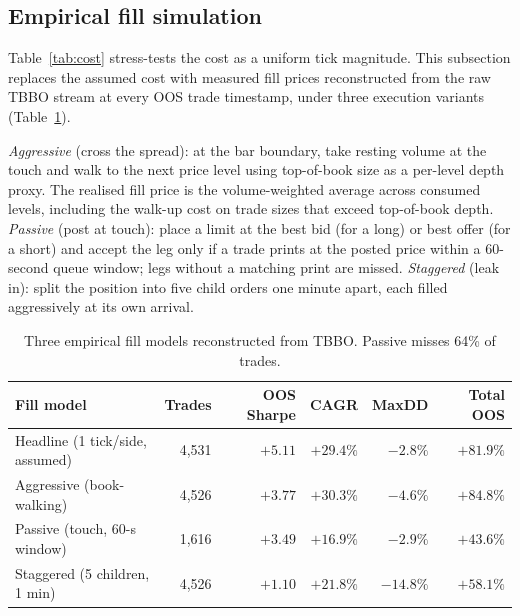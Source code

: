 ﻿\documentclass[11pt,a4paper]{article}
\begin{document}
\subsection{Empirical fill simulation}

Table~\ref{tab:cost} stress-tests the cost as a uniform tick magnitude. This subsection replaces the assumed cost with measured fill prices reconstructed from the raw TBBO stream at every OOS trade timestamp, under three execution variants (Table~\ref{tab:fillsim}).

\emph{Aggressive} (cross the spread): at the bar boundary, take resting volume at the touch and walk to the next price level using top-of-book size as a per-level depth proxy. The realised fill price is the volume-weighted average across consumed levels, including the walk-up cost on trade sizes that exceed top-of-book depth. \emph{Passive} (post at touch): place a limit at the best bid (for a long) or best offer (for a short) and accept the leg only if a trade prints at the posted price within a 60-second queue window; legs without a matching print are missed. \emph{Staggered} (leak in): split the position into five child orders one minute apart, each filled aggressively at its own arrival.

\begin{table}[H]
\centering
\small
\begin{tabular}{lrrrrr}
\toprule
Fill model & Trades & OOS Sharpe & CAGR & MaxDD & Total OOS \\
\midrule
Headline (1 tick/side, assumed)  & 4{,}531 & $+5.11$ & $+29.4\%$ & $-2.8\%$  & $+81.9\%$ \\
Aggressive (book-walking)        & 4{,}526 & $+3.77$ & $+30.3\%$ & $-4.6\%$  & $+84.8\%$ \\
Passive (touch, 60-s window)     & 1{,}616 & $+3.49$ & $+16.9\%$ & $-2.9\%$  & $+43.6\%$ \\
Staggered (5 children, 1 min)    & 4{,}526 & $+1.10$ & $+21.8\%$ & $-14.8\%$ & $+58.1\%$ \\
\bottomrule
\end{tabular}
\caption{Three empirical fill models reconstructed from TBBO. Passive misses 64\% of trades.}
\label{tab:fillsim}
\end{table}
\end{document}
